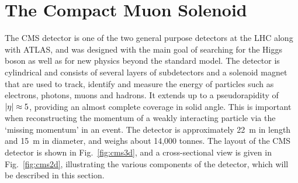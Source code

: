 \section{The Compact Muon Solenoid}
The CMS detector is one of the two general purpose detectors at the LHC along 
with ATLAS, and was designed with the main goal of searching for the Higgs 
boson as well as for new physics beyond the standard model. The detector is 
cylindrical 
and consists of several layers of subdetectors and a solenoid magnet that are 
used to track, identify and measure the energy of particles such as electrons, 
photons, muons and hadrons. 
It extends up to a pseudorapidity of $|\eta| \approx 5$, providing an almost 
complete coverage in solid angle. This is important when reconstructing the 
momentum of a weakly interacting particle via the `missing momentum' in an 
event.
The detector is approximately 22~m in length and 15~m in diameter, and weighs 
about 14,000 tonnes.
The layout of the CMS detector is shown in Fig.~\ref{fig:cms3d}, and a 
cross-sectional view is given in Fig.~\ref{fig:cms2d}, illustrating the various 
components of the detector, which will be described in this section.

